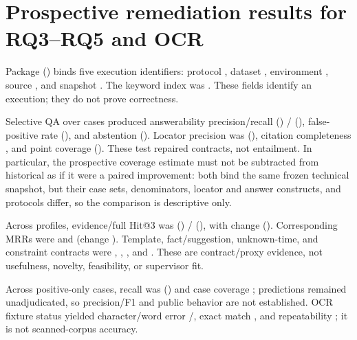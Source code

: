 \section{Prospective remediation results for RQ3--RQ5 and OCR}

Package \VTwoPackageStatus{} (\VTwoEvidenceTier{}) binds five execution identifiers: protocol \texttt{\VTwoProtocolShaPrefix}, dataset \texttt{\VTwoFrozenDatasetShaPrefix}, environment \texttt{\VTwoLockedEnvironmentShaPrefix}, source \texttt{\VTwoEvaluationSourceCommitPrefix}, and snapshot \texttt{\VTwoCorpusSnapshotShaPrefix}. The keyword index was \VTwoKeywordIndexCompleteness{}. These fields identify an execution; they do not prove correctness.

Selective QA over \VTwoQATestCases{} cases produced answerability precision/recall \VTwoQAAnswerabilityPrecision{} (\VTwoQAAnswerabilityPrecisionCi{}) / \VTwoQAAnswerabilityRecall{} (\VTwoQAAnswerabilityRecallCi{}), false-positive rate \VTwoQAFalsePositiveRate{} (\VTwoQAFalsePositiveRateCi{}), and abstention \VTwoQAAbstentionRate{} (\VTwoQAAbstentionRateCi{}). Locator precision was \VTwoQACitationLocatorPrecision{} (\VTwoQACitationLocatorPrecisionCi{}), citation completeness \VTwoQACitationCompleteness{}, and point coverage \VTwoQAAnswerPointCoverage{} (\VTwoQAAnswerPointCoverageCi{}). These test repaired contracts, not entailment. In particular, the prospective coverage estimate must not be subtracted from historical \QaAnswerPointCoverage{} as if it were a paired improvement: both bind the same frozen technical snapshot, but their case sets, denominators, locator and answer constructs, and protocols differ, so the comparison is descriptive only.

Across \VTwoFinderTestProfiles{} profiles, evidence/full Hit@3 was \VTwoFinderEvidenceHitAtThree{} (\VTwoFinderEvidenceHitAtThreeCi{}) / \VTwoFinderFullHitAtThree{} (\VTwoFinderFullHitAtThreeCi{}), with change \VTwoFinderHitAtThreeDelta{} (\VTwoFinderHitAtThreeDeltaCi{}). Corresponding MRRs were \VTwoFinderEvidenceMRR{} and \VTwoFinderFullMRR{} (change \VTwoFinderMRRDelta{}). Template, fact/suggestion, unknown-time, and constraint contracts were \VTwoFinderTemplateConformance{}, \VTwoFinderFactSuggestionSeparation{}, \VTwoFinderUnknownTimeRetention{}, and \VTwoFinderConstraintFidelity{}. These are contract/proxy evidence, not usefulness, novelty, feasibility, or supervisor fit.

Across \VTwoTopicTestCases{} positive-only cases, recall was \VTwoTopicKnownPositiveRecall{} (\VTwoTopicKnownPositiveRecallCi{}) and case coverage \VTwoTopicKnownPositiveCaseCoverage{}; \VTwoTopicUnadjudicatedPredictionCount{} predictions remained unadjudicated, so precision/F1 and public behavior are not established. OCR fixture status \VTwoOCRStatus{} yielded character/word error \VTwoOCRCharacterErrorRate{}/\VTwoOCRWordErrorRate{}, exact match \VTwoOCRExactMatch{}, and repeatability \VTwoOCRRepeatable{}; it is not scanned-corpus accuracy.

